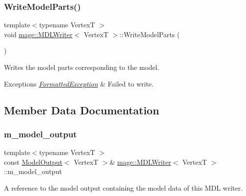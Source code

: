 \subsubsection{\texorpdfstring{Write\+Model\+Parts()}{WriteModelParts()}}
{\footnotesize\ttfamily template$<$typename VertexT $>$ \\
void \hyperlink{classmage_1_1_m_d_l_writer}{mage\+::\+M\+D\+L\+Writer}$<$ VertexT $>$\+::Write\+Model\+Parts (\begin{DoxyParamCaption}{ }\end{DoxyParamCaption})\hspace{0.3cm}{\ttfamily [private]}}

Writes the model parts corresponding to the model.


\begin{DoxyExceptions}{Exceptions}
{\em \hyperlink{structmage_1_1_formatted_exception}{Formatted\+Exception}} & Failed to write. \\
\hline
\end{DoxyExceptions}


\subsection{Member Data Documentation}
\hypertarget{classmage_1_1_m_d_l_writer_a607fc83a3dbab79f55c3eaca203c027b}{}\label{classmage_1_1_m_d_l_writer_a607fc83a3dbab79f55c3eaca203c027b} 
\subsubsection{\texorpdfstring{m\+\_\+model\+\_\+output}{m\_model\_output}}
{\footnotesize\ttfamily template$<$typename VertexT $>$ \\
const \hyperlink{structmage_1_1_model_output}{Model\+Output}$<$ VertexT $>$\& \hyperlink{classmage_1_1_m_d_l_writer}{mage\+::\+M\+D\+L\+Writer}$<$ VertexT $>$\+::m\+\_\+model\+\_\+output\hspace{0.3cm}{\ttfamily [private]}}

A reference to the model output containing the model data of this M\+DL writer. 